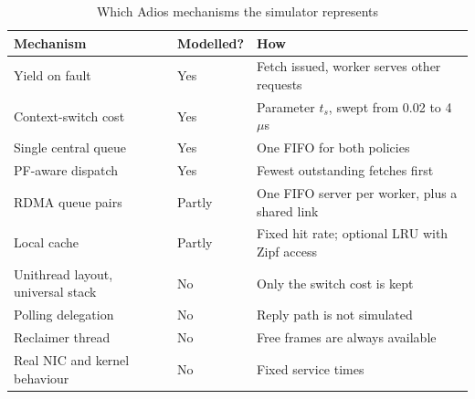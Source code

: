 \begin{table}[t]
\caption{Which Adios mechanisms the simulator represents}
\label{tab:modelled}
\centering
\footnotesize
\begin{tabular}{p{2.5cm}p{1.1cm}p{3.5cm}}
\toprule
Mechanism & Modelled? & How \\
\midrule
Yield on fault & Yes & Fetch issued, worker serves other requests \\
Context-switch cost & Yes & Parameter $t_s$, swept from 0.02 to 4~$\mu$s \\
Single central queue & Yes & One FIFO for both policies \\
PF-aware dispatch & Yes & Fewest outstanding fetches first \\
RDMA queue pairs & Partly & One FIFO server per worker, plus a shared link \\
Local cache & Partly & Fixed hit rate; optional LRU with Zipf access \\
Unithread layout, universal stack & No & Only the switch cost is kept \\
Polling delegation & No & Reply path is not simulated \\
Reclaimer thread & No & Free frames are always available \\
Real NIC and kernel behaviour & No & Fixed service times \\
\bottomrule
\end{tabular}
\end{table}
